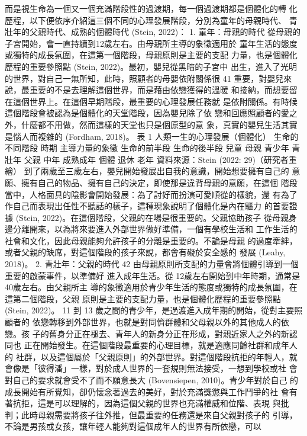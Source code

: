 而是視生命為一個又一個充滿階段性的過渡期，每一個過渡期都是個體化的轉
化歷程，以下便依序介紹這三個不同的心理發展階段，分別為童年的母親時代、
青壯年的父親時代、成熟的個體時代 (Stein, 2022)： 
1. 童年：母親的時代 
從母親的子宮開始，會一直持續到12歲左右。由母親所主導的象徵適用於
童年生活的態度或獨特的成長氛圍，在這第一個階段，母親原則是主要的支配
力量，也是個體化歷程的重要參照點 (Stein, 2022)。最初，嬰兒從黑暗的子宮中
出生，進入了光明的世界，對自己一無所知，此時，照顧者的母嬰依附關係很
41 
重要，對嬰兒來說，最重要的不是去理解這個世界，而是藉由依戀獲得的溫暖
和接納，而想要留在這個世界上。在這個早期階段，最重要的心理發展任務就
是依附關係。有時候這個階段會被認為是個體化的天堂階段，因為嬰兒除了依
戀和回應照顧者的愛之外，什麼都不用做，然而這樣的天堂也只是個原型的意
象，真實的嬰兒生活其實是惱人而複雜的 (Fordham, 2018)。 
表 1  
人類一生的心理發展（個體化） 
生命的不同階段 時期 主導力量的象徵 
生命的前半段 
生命的後半段 
兒童 母親 
青少年 
青壯年 父親 
中年 
成熟成年 
個體 
退休 
老年 
資料來源：Stein (2022: 29)（研究者重繪） 
到了兩歲至三歲左右，嬰兒開始發展出自我的意識，開始想要擁有自己的
意願、擁有自己的物品、擁有自己的決定，即使那是違背母親的意願，在這個
階段當中，人格面具的陰影會開始發展：為了討好而扮演可愛順從的樣貌，還
有為了作自己而表現出任性不聽話的樣子，這種現象說明了個體化是內在驅力
的首要證據 (Stein, 2022)。在這個階段，父親的在場是很重要的。父親協助孩子
從母親身邊分離開來，以為將來要進入外部世界做好準備，一個有學校生活和
工作生活的社會和文化，因此母親能夠允許孩子的分離是重要的。不論是母親
的過度牽絆，或者父親的缺席，對這個階段的孩子來說，都會有礙於安全感的
發展 (Leahy, 2018)。 
2. 青壯年：父親的時代 
42 
由母親原則所支配的力量會將個體引導到一個重要的啟蒙事件，以準備好
進入成年生活。從 12歲左右開始到中年時期，通常是 40歲左右。由父親所主
導的象徵適用於青少年生活的態度或獨特的成長氛圍，在這第二個階段，父親
原則是主要的支配力量，也是個體化歷程的重要參照點 (Stein, 2022)。 
11 到 13 歲之間的青少年，是過渡進入成年期的開始，從對主要照顧者的
依戀轉移到外部世界，也就是對同儕群體和父母親以外的其他成人的依戀。孩
子的舊身分正在褪去、青年人的新身分正在形成，對親近家人之外的新認同也
正在開始發生。在這個階段最重要的心理目標，就是適應同齡社群和成年人的
社群，以及這個屬於「父親原則」的外部世界。對這個階段抗拒的年輕人，就
會像是「彼得潘」一樣，對於成人世界的一套規則無法接受，一想到學校或社
會對自己的要求就會受不了而不願意長大 (Bovensiepen, 2010)。青少年對於自己
的成長開始有所覺知，卻仍懷念著過去的美好，對於充滿獎懲與工作鬥爭的社
會有著抗拒，這是可以理解的，因為這個父親的世界也充滿權威和位階、表現
與批判；此時母親需要將孩子往外推，但最重要的任務還是來自父親對孩子的
引導，不論是男孩或女孩，讓年輕人能夠對這個成年人的世界有所依戀，可以
